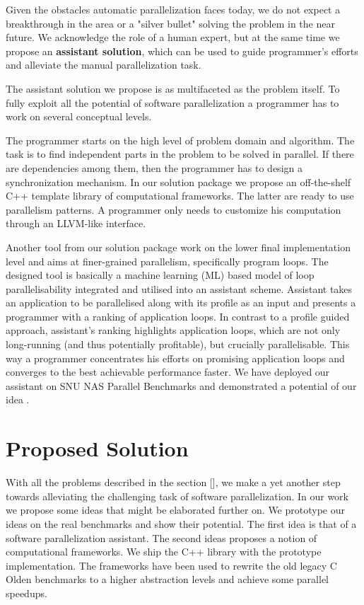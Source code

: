 
\quad Given the obstacles automatic parallelization faces today, we do not expect a breakthrough in the area or a "silver bullet" solving the problem in the near future. We acknowledge the role of a human expert, but at the same time we propose an \textbf{assistant solution}, which can be used to guide programmer's efforts and alleviate the manual parallelization task.


\quad The assistant solution we propose is as multifaceted as the problem itself. To fully exploit all the potential of software parallelization a programmer has to work on several conceptual levels. 


\quad The programmer starts on the high level of problem domain and algorithm. The task is to find independent parts in the problem to be solved in parallel. If there are dependencies among them, then the programmer has to design a synchronization mechanism. In our solution package we propose an off-the-shelf C++ template library of computational frameworks. The latter are ready to use parallelism patterns. A programmer only needs to customize his computation through an LLVM-like interface.


\quad Another tool from our solution package work on the lower final implementation level and aims at finer-grained parallelism, specifically program loops. The designed tool is basically a machine learning (ML) based model of loop parallelisability integrated and utilised into an assistant scheme. Assistant takes an application to be parallelised along with its profile as an input and presents a programmer with a ranking of application loops. In contrast to a profile guided approach, assistant's ranking highlights application loops, which are not only long-running (and thus potentially profitable), but crucially parallelisable. This way a programmer concentrates his efforts on promising application loops and converges to the best achievable performance faster. We have deployed our assistant on SNU NAS Parallel Benchmarks \cite{snu-npb-benchmarks} \cite{nasa-parallel-benchmarks} and demonstrated a potential of our idea \cite{aiseps}.



\section{Proposed Solution}
\quad With all the problems described in the section [], we make a yet another step towards alleviating the challenging task of software parallelization. In our work we propose some ideas that might be elaborated further on. We prototype our ideas on the real benchmarks and show their potential. The first idea is that of a software parallelization assistant. The second ideas proposes a notion of computational frameworks. We ship the C++ library with the prototype implementation. The frameworks have been used to rewrite the old legacy C Olden benchmarks to a higher abstraction levels and achieve some parallel speedups.

